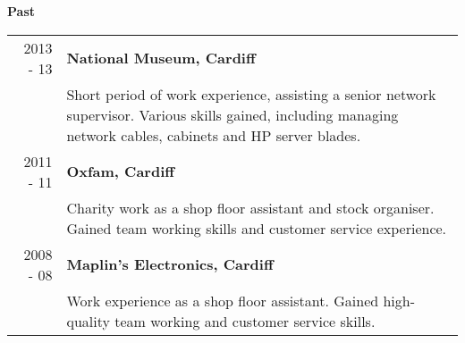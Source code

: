 \documentclass[a4paper,12pt,final,sans]{memoir}
\begin{document}
\newpage
\textbf{\textsf{\color{head} Past}} \\[-1.5em]
\begin{longtable}{r p{16cm}}
2013 - 13 & \textbf{\textsf{\color{head} National Museum, Cardiff}}\\[0.3em]
	 & 
	 Short period of work experience, assisting a senior network supervisor. Various skills gained, including managing network cables, cabinets and HP server blades. \\[0.5em]

2011 - 11 & \textbf{\textsf{\color{head} Oxfam, Cardiff}}\\[0.3em]
	 & Charity work as a shop floor assistant and stock organiser. Gained team working skills and customer service experience. \\[0.5em]

2008 - 08 & \textbf{\textsf{\color{head} Maplin’s Electronics, Cardiff}}\\[0.3em]
	 & Work experience as a shop floor assistant. Gained high-quality team working and customer service skills.\\
\end{longtable}

\vspace{-0.5mm}
\end{document}
